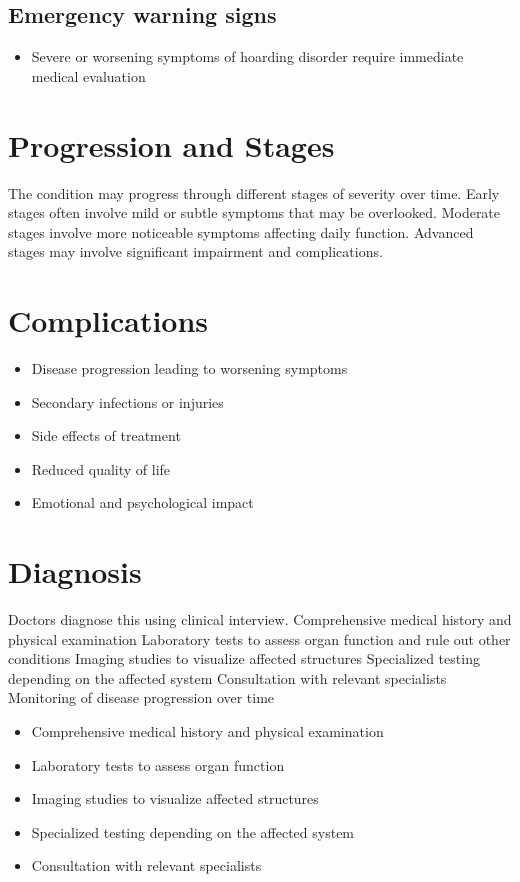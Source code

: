 \subsection{Emergency warning signs}
\begin{itemize}[noitemsep]
  \item Severe or worsening symptoms of hoarding disorder require immediate medical evaluation
\end{itemize}
\section{Progression and Stages}
The condition may progress through different stages of severity over time. Early stages often involve mild or subtle symptoms that may be overlooked. Moderate stages involve more noticeable symptoms affecting daily function. Advanced stages may involve significant impairment and complications.
\section{Complications}
\begin{itemize}[noitemsep]
  \item Disease progression leading to worsening symptoms
  \item Secondary infections or injuries
  \item Side effects of treatment
  \item Reduced quality of life
  \item Emotional and psychological impact
\end{itemize}
\section{Diagnosis}
Doctors diagnose this using clinical interview. Comprehensive medical history and physical examination Laboratory tests to assess organ function and rule out other conditions Imaging studies to visualize affected structures Specialized testing depending on the affected system Consultation with relevant specialists Monitoring of disease progression over time

\begin{itemize}[noitemsep]
  \item Comprehensive medical history and physical examination
  \item Laboratory tests to assess organ function
  \item Imaging studies to visualize affected structures
  \item Specialized testing depending on the affected system
  \item Consultation with relevant specialists
\end{itemize}
